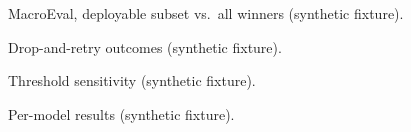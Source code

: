 \documentclass{article}
\begin{document}
\begin{table}[t]
  \centering
  \caption{MacroEval, deployable subset vs.\ all winners (synthetic fixture).}
  \small
  \setlength{\tabcolsep}{3pt}
  
\end{table}

\begin{table}[t]
  \centering
  \caption{Drop-and-retry outcomes (synthetic fixture).}
  \small
  \setlength{\tabcolsep}{3pt}
  
\end{table}

\begin{table}[t]
  \centering
  \caption{Threshold sensitivity (synthetic fixture).}
  \small
  \setlength{\tabcolsep}{4pt}
  
\end{table}

\begin{table}[p]
  \centering
  \caption{Per-model results (synthetic fixture).}
  \small
  \setlength{\tabcolsep}{3pt}
  \resizebox{\linewidth}{!}{}
\end{table}
\end{document}
